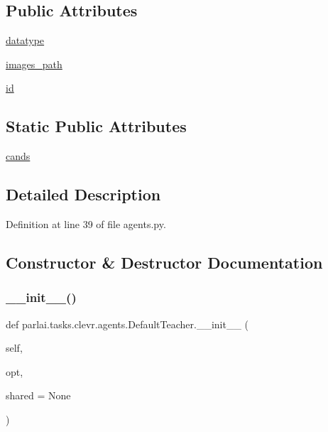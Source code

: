\subsection*{Public Attributes}
\begin{DoxyCompactItemize}
\item 
\hyperlink{classparlai_1_1tasks_1_1clevr_1_1agents_1_1DefaultTeacher_a7bdb21c7cb0d04c3470c069125ea3d4a}{datatype}
\item 
\hyperlink{classparlai_1_1tasks_1_1clevr_1_1agents_1_1DefaultTeacher_a524bed88c209582a3ccdc7693ba08214}{images\+\_\+path}
\item 
\hyperlink{classparlai_1_1tasks_1_1clevr_1_1agents_1_1DefaultTeacher_ab936a3d7fc5e5249495d9a42a30d0708}{id}
\end{DoxyCompactItemize}
\subsection*{Static Public Attributes}
\begin{DoxyCompactItemize}
\item 
\hyperlink{classparlai_1_1tasks_1_1clevr_1_1agents_1_1DefaultTeacher_a36fd7947d3c862e13b5964a573f22993}{cands}
\end{DoxyCompactItemize}


\subsection{Detailed Description}


Definition at line 39 of file agents.\+py.



\subsection{Constructor \& Destructor Documentation}
\mbox{\label{classparlai_1_1tasks_1_1clevr_1_1agents_1_1DefaultTeacher_a6b201b7448a18fbc9c75ffd75ed6febb}} 
\subsubsection{\texorpdfstring{\+\_\+\+\_\+init\+\_\+\+\_\+()}{\_\_init\_\_()}}
{\footnotesize\ttfamily def parlai.\+tasks.\+clevr.\+agents.\+Default\+Teacher.\+\_\+\+\_\+init\+\_\+\+\_\+ (\begin{DoxyParamCaption}\item[{}]{self,  }\item[{}]{opt,  }\item[{}]{shared = {\ttfamily None} }\end{DoxyParamCaption})}



